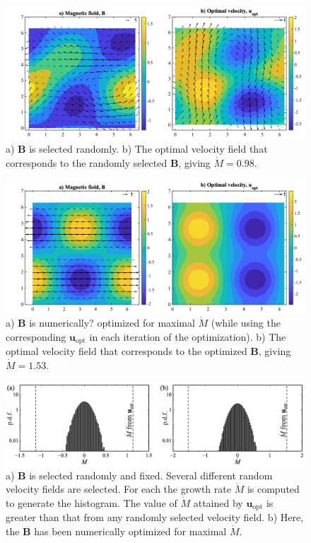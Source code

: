 \documentclass[onecolumn,showpacs,preprintnumbers,amsmath,amssymb]{revtex4-2}
\newcommand{\nick}[1]{{\color{orange}#1}}
\newcommand{\bvec}[1]{{\mathbf{#1}}}
\newcommand{\uu}{\bvec{u}}
\newcommand{\uopt}{\uu_{\text{opt}}}
\newcommand{\Bvec}{\bvec{B}}
\begin{document}
\begin{figure}[htb]
\centering
 \includegraphics[width=.99 \linewidth]{vfields_ran_K=1.png}
 \caption{
a) $\Bvec$ is selected randomly.
b) The optimal velocity field that corresponds to the randomly selected $\Bvec$, giving $\dot{M} = 0.98$.}
\label{vfields_ran_K=1}
\end{figure}

\begin{figure}[htb]
\centering
 \includegraphics[width=.99 \linewidth]{vfields_opt_K=1.png}
 \caption{
a) $\Bvec$ is \nick{numerically?} optimized for maximal $\dot{M}$ (while using the corresponding $\uopt$ in each iteration of the optimization).
b) The optimal velocity field that corresponds to the optimized $\Bvec$, giving $\dot{M} = 1.53$.}
\label{vfields_opt_K=1}
\end{figure}

\begin{figure}[htb]
\centering
 \includegraphics[width=.99 \linewidth]{histograms.png}
 \caption{
a) $\Bvec$ is selected randomly and fixed. Several different random velocity fields are selected. For each the growth rate $\dot{M}$ is computed to generate the histogram. The value of $\dot{M}$ attained by $\uopt$ is greater than that from any randomly selected velocity field.
b) Here, the $\Bvec$ has been numerically optimized for maximal $\dot{M}$.}
\label{histograms}
\end{figure}
\end{document}
